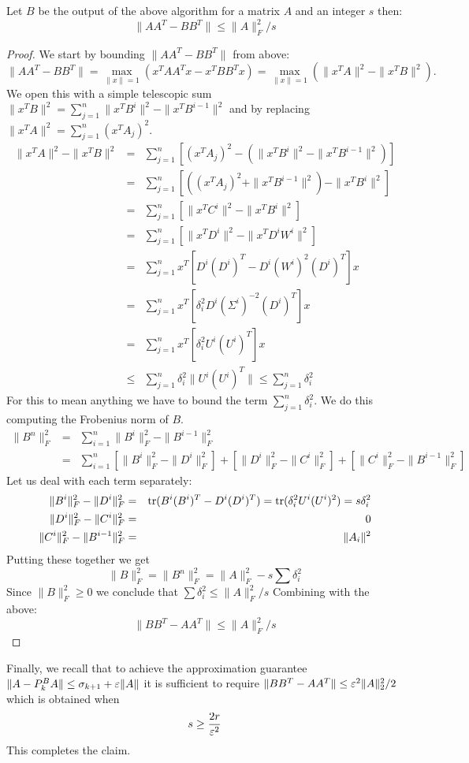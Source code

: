 \documentclass{article}
\begin{document}
\begin{lemma}
Let $B$ be the output of the above algorithm for a matrix $A$ and an integer $s$ then:
\[
\|AA^T - BB^T\| \le \|A\|_F^2/s
\]
\end{lemma}
\begin{proof}
We start by bounding $\|AA^T - BB^T\|$ from above:
\[
\|AA^T - BB^T\| = \max_{\|x\|=1} (x^TAA^Tx - x^TBB^Tx) = \max_{\|x\|=1} (\|x^TA\|^2 - \|x^TB\|^2).
\]
We open this with a simple telescopic sum $\|x^TB\|^2 = \sum_{j=1}^{n}\|x^TB^{i}\|^2 - \|x^TB^{i-1}\|^2$ and by replacing $\|x^TA\|^2 = \sum_{j=1}^{n}(x^TA_j)^2$.
\begin{eqnarray}
\|x^TA\|^2 - \|x^TB\|^2 &=& \sum_{j=1}^{n} [ (x^TA_j)^2  - (\|x^TB^{i}\|^2 - \|x^TB^{i-1}\|^2)]\\
&=& \sum_{j=1}^{n} [ ((x^TA_j)^2  + \|x^TB^{i-1}\|^2)   - \|x^TB^{i}\|^2 ]\\
&=& \sum_{j=1}^{n} [ \|x^TC^{i}\|^2   - \|x^TB^{i}\|^2 ]\\
&=& \sum_{j=1}^{n} [ \|x^TD^{i}\|^2   - \|x^TD^{i}W^{i}\|^2 ]\\
&=& \sum_{j=1}^{n}  x^T[D^{i}(D^{i})^{T}   - D^{i}(W^{i})^{2}(D^{i})^{T}]x \\
&=& \sum_{j=1}^{n}  x^T[\delta_{i}^2 D^{i} (\Sigma^{i})^{-2}(D^{i})^T]x \\
&=& \sum_{j=1}^{n}  x^T[\delta_{i}^2 U^{i}(U^{i})^T]x \\
&\le& \sum_{j=1}^{n} \delta_{i}^2 \|U^{i}(U^{i})^T\| \le \sum_{j=1}^{n} \delta_{i}^2
\end{eqnarray}
%
\noindent For this to mean anything we have to bound the term $\sum_{j=1}^{n} \delta_{i}^2$. We do this computing the Frobenius norm of $B$.
\begin{eqnarray}
\|B^{n}\|_{F}^{2} &=& \sum_{i=1}^{n} \|B^{i}\|_{F}^{2} - \|B^{i-1}\|_{F}^{2}\\
&=& \sum_{i=1}^{n} [\|B^{i}\|_{F}^{2} - \|D^{i}\|_{F}^{2}] + [\|D^{i}\|_{F}^{2} - \|C^{i}\|_{F}^{2}] + [\|C^{i}\|_{F}^{2} -  \|B^{i-1}\|_{F}^{2}]
\end{eqnarray}
Let us deal with each term separately: 
\begin{eqnarray}
\|B^{i}\|_{F}^{2} - \|D^{i}\|_{F}^{2} &=& \operatorname{tr}(B^{i}(B^{i})^{T} - D^{i}(D^{i})^{T}) = \operatorname{tr}(\delta^2_i U^{i}(U^{i})^2) = s\delta^2_i\\
\|D^{i}\|_{F}^{2} - \|C^{i}\|_{F}^{2} &=& 0\\
\|C^{i}\|_{F}^{2} -  \|B^{i-1}\|_{F}^{2} &=& \|A_i\|^2
\end{eqnarray}
Putting these together we get 
\[
\|B\|_{F}^{2} = \|B^{n}\|_{F}^{2}  = \|A\|_F^2 - s \sum \delta_{i}^2
\]
Since $\|B\|_{F}^{2} \ge 0$ we conclude that $\sum \delta_{i}^2 \le \|A\|_F^2/s$
Combining with the above:
\[
\|BB^T - AA^T\| \le \|A\|_F^2/s
\]
\end{proof}
\noindent Finally, we recall that to achieve the approximation guarantee
$\|A - P_k^BA\| \le \sigma_{k+1} + \varepsilon\|A\|$ it is sufficient to require $\|BB^T - AA^T\| \le \varepsilon^2\|A\|_2^2/2$ which is obtained when
\[
s \ge \frac{2r}{\varepsilon^2}
\]
This completes the claim.
\end{document}
